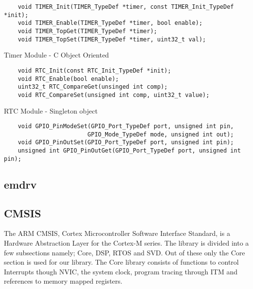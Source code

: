 \begin{listing}[H]
  \begin{verbatim}
    void TIMER_Init(TIMER_TypeDef *timer, const TIMER_Init_TypeDef *init);
    void TIMER_Enable(TIMER_TypeDef *timer, bool enable);
    void TIMER_TopGet(TIMER_TypeDef *timer);
    void TIMER_TopSet(TIMER_TypeDef *timer, uint32_t val);
  \end{verbatim}
  \caption{Timer Module - C Object Oriented}
  \label{lst:back:lib:timer}
\end{listing}

\begin{listing}[H]
  \begin{verbatim}
    void RTC_Init(const RTC_Init_TypeDef *init);
    void RTC_Enable(bool enable);
    uint32_t RTC_CompareGet(unsinged int comp);
    void RTC_CompareSet(unsigned int comp, uint32_t value);
  \end{verbatim}
  \caption{RTC Module - Singleton object}
  \label{lst:back:lib:rtc}
\end{listing}

\begin{listing}[H]
  \begin{verbatim}
    void GPIO_PinModeSet(GPIO_Port_TypeDef port, unsigned int pin,
                        GPIO_Mode_TypeDef mode, unsigned int out);
    void GPIO_PinOutSet(GPIO_Port_TypeDef port, unsigned int pin);
    unsigned int GPIO_PinOutGet(GPIO_Port_TypeDef port, unsigned int pin);
  \end{verbatim}
  \caption{}
  \label{lst:back:lib:gpio}
\end{listing}

\subsection{emdrv}

\subsection{CMSIS}

The ARM CMSIS, Cortex Microcontroller Software Interface Standard, is a Hardware Abstraction Layer for the Cortex-M series.
The library is divided into a few subsections namely; Core, DSP, RTOS and SVD.
Out of these only the Core section is used for our library.
The Core library consists of functions to control Interrupts though NVIC, the system clock, program tracing through ITM and references to memory mapped registers.



